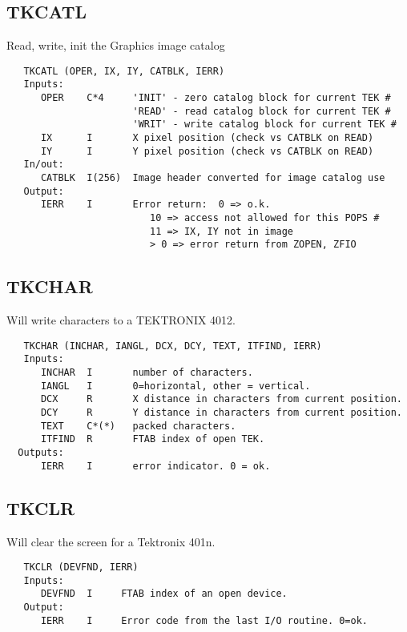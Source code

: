 \subsection{TKCATL}
Read, write, init the Graphics image catalog
\begin{verbatim}
   TKCATL (OPER, IX, IY, CATBLK, IERR)
   Inputs:
      OPER    C*4     'INIT' - zero catalog block for current TEK #
                      'READ' - read catalog block for current TEK #
                      'WRIT' - write catalog block for current TEK #
      IX      I       X pixel position (check vs CATBLK on READ)
      IY      I       Y pixel position (check vs CATBLK on READ)
   In/out:
      CATBLK  I(256)  Image header converted for image catalog use
   Output:
      IERR    I       Error return:  0 => o.k.
                         10 => access not allowed for this POPS #
                         11 => IX, IY not in image
                         > 0 => error return from ZOPEN, ZFIO
\end{verbatim}

\subsection{TKCHAR}
Will write characters to a TEKTRONIX 4012.
\begin{verbatim}
   TKCHAR (INCHAR, IANGL, DCX, DCY, TEXT, ITFIND, IERR)
   Inputs:
      INCHAR  I       number of characters.
      IANGL   I       0=horizontal, other = vertical.
      DCX     R       X distance in characters from current position.
      DCY     R       Y distance in characters from current position.
      TEXT    C*(*)   packed characters.
      ITFIND  R       FTAB index of open TEK.
  Outputs:
      IERR    I       error indicator. 0 = ok.
\end{verbatim}

\subsection{TKCLR}
Will clear the screen for a Tektronix 401n.
\begin{verbatim}
   TKCLR (DEVFND, IERR)
   Inputs:
      DEVFND  I     FTAB index of an open device.
   Output:
      IERR    I     Error code from the last I/O routine. 0=ok.
\end{verbatim}

